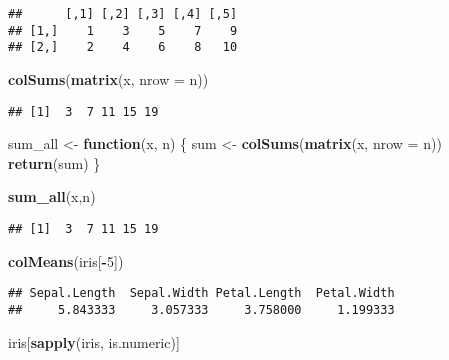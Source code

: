 \documentclass[]{article}
\newenvironment{Shaded}{\begin{snugshade}}{\end{snugshade}}
\newcommand{\ControlFlowTok}[1]{\textcolor[rgb]{0.13,0.29,0.53}{\textbf{#1}}}
\newcommand{\DataTypeTok}[1]{\textcolor[rgb]{0.13,0.29,0.53}{#1}}
\newcommand{\DecValTok}[1]{\textcolor[rgb]{0.00,0.00,0.81}{#1}}
\newcommand{\KeywordTok}[1]{\textcolor[rgb]{0.13,0.29,0.53}{\textbf{#1}}}
\newcommand{\NormalTok}[1]{#1}
\newcommand{\OperatorTok}[1]{\textcolor[rgb]{0.81,0.36,0.00}{\textbf{#1}}}
\newcommand{\StringTok}[1]{\textcolor[rgb]{0.31,0.60,0.02}{#1}}
\begin{document}
\begin{verbatim}
##      [,1] [,2] [,3] [,4] [,5]
## [1,]    1    3    5    7    9
## [2,]    2    4    6    8   10
\end{verbatim}

\begin{Shaded}
\begin{Highlighting}[]
\KeywordTok{colSums}\NormalTok{(}\KeywordTok{matrix}\NormalTok{(x, }\DataTypeTok{nrow =}\NormalTok{ n))}
\end{Highlighting}
\end{Shaded}

\begin{verbatim}
## [1]  3  7 11 15 19
\end{verbatim}

\begin{Shaded}
\begin{Highlighting}[]
\NormalTok{sum_all <-}\StringTok{ }\ControlFlowTok{function}\NormalTok{(x, n) \{}
\NormalTok{  sum <-}\StringTok{ }\KeywordTok{colSums}\NormalTok{(}\KeywordTok{matrix}\NormalTok{(x, }\DataTypeTok{nrow =}\NormalTok{ n))}
  \KeywordTok{return}\NormalTok{(sum)}
\NormalTok{\}}
\end{Highlighting}
\end{Shaded}

\begin{Shaded}
\begin{Highlighting}[]
\KeywordTok{sum_all}\NormalTok{(x,n)}
\end{Highlighting}
\end{Shaded}

\begin{verbatim}
## [1]  3  7 11 15 19
\end{verbatim}

\begin{Shaded}
\begin{Highlighting}[]
\KeywordTok{colMeans}\NormalTok{(iris[}\OperatorTok{-}\DecValTok{5}\NormalTok{])}
\end{Highlighting}
\end{Shaded}

\begin{verbatim}
## Sepal.Length  Sepal.Width Petal.Length  Petal.Width 
##     5.843333     3.057333     3.758000     1.199333
\end{verbatim}

\begin{Shaded}
\begin{Highlighting}[]
\NormalTok{iris[}\KeywordTok{sapply}\NormalTok{(iris, is.numeric)]}
\end{Highlighting}
\end{Shaded}
\end{document}

